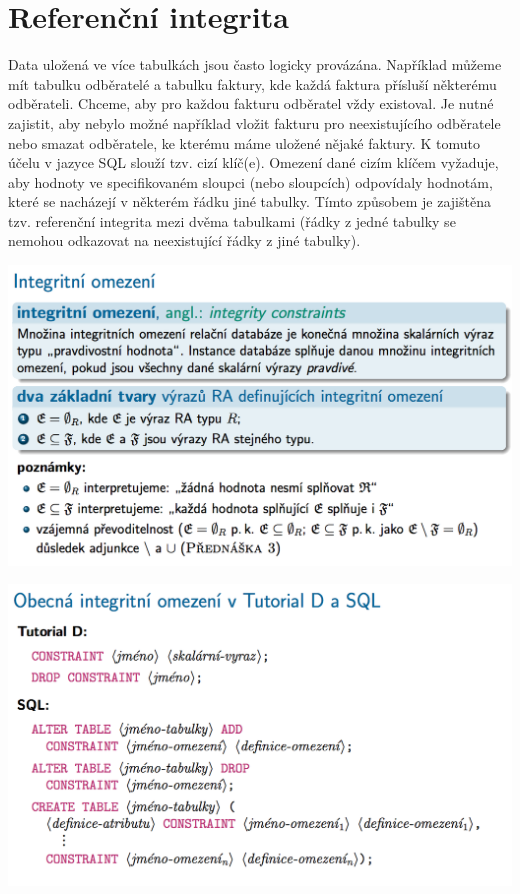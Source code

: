 \documentclass[10pt,a4paper]{article}
\begin{document}
\section{Referenční integrita}
Data uložená ve více tabulkách jsou často logicky provázána. Například můžeme mít tabulku odběratelé a tabulku faktury, kde každá faktura přísluší některému odběrateli. Chceme, aby pro každou fakturu odběratel vždy existoval. Je nutné zajistit, aby nebylo možné například vložit fakturu pro neexistujícího odběratele nebo smazat odběratele, ke kterému máme uložené nějaké faktury.
K tomuto účelu v jazyce SQL slouží tzv. cizí klíč(e). Omezení dané cizím klíčem vyžaduje, aby hodnoty ve specifikovaném sloupci (nebo sloupcích) odpovídaly hodnotám, které se nacházejí v některém řádku jiné tabulky. Tímto způsobem je zajištěna tzv. referenční integrita mezi dvěma tabulkami (řádky z jedné tabulky se nemohou odkazovat na neexistující řádky z jiné tabulky).
	
	\includegraphics[scale=0.4]{img/60}
	
	\includegraphics[scale=0.4]{img/61}
	
\end{document}
